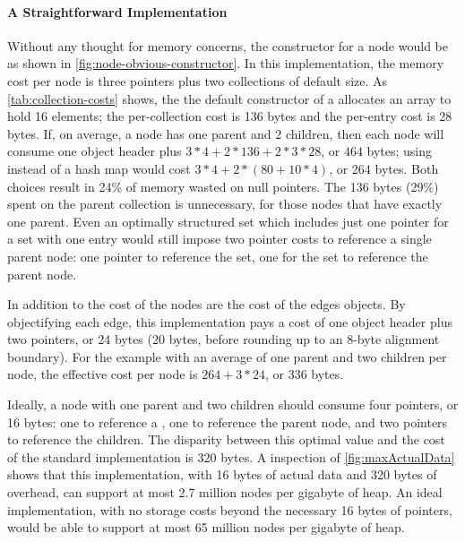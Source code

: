 \paragraph{A Straightforward Implementation}
Without any thought for memory concerns, the constructor for a node would be as
shown in \autoref{fig:node-obvious-constructor}. In this implementation, the
memory cost per node is three pointers plus two collections of default size. As
\autoref{tab:collection-costs} shows, the the default constructor of a
 allocates an array to hold 16 elements; the per-collection cost
is 136 bytes and the per-entry cost is 28 bytes. If, on average, a node has one
parent and 2 children, then each node will consume one object header plus $3*4
+2*136 + 2*3*28$, or $464$ bytes; using  instead of a hash map
would cost $3*4+ 2*(80 + 10*4)$, or $264$ bytes. Both choices result in 24\% of
memory wasted on null pointers.
The 136 bytes (29\%) spent on the parent collection is unnecessary, for those
nodes that have exactly one parent. Even an optimally structured set which
includes just one pointer for a set with one entry would still impose two pointer
costs to reference a single parent node: one pointer to reference the set, one
for the set to reference the parent node.

In addition to the cost of the nodes are the cost of the edges objects. By
objectifying each edge, this implementation pays a cost of one object header
plus two pointers, or 24 bytes (20 bytes, before rounding up to an 8-byte
alignment boundary). For the example with an average of one parent and two
children per node, the effective cost per node is $264 + 3*24$, or $336$ bytes.

Ideally, a node with one parent and two children should consume four pointers, or
16 bytes: one to reference a , one to reference the parent node, and
two pointers to reference the children. The disparity between this optimal value
and the cost of the standard implementation is 320 bytes. A inspection of
\autoref{fig:maxActualData} shows that this implementation, with 16 bytes of
actual data and 320 bytes of overhead, can support at most 2.7 million nodes per
gigabyte of heap. An ideal implementation, with no storage costs beyond the
necessary 16 bytes of pointers, would be able to support at most 65 million nodes
per gigabyte of heap.


